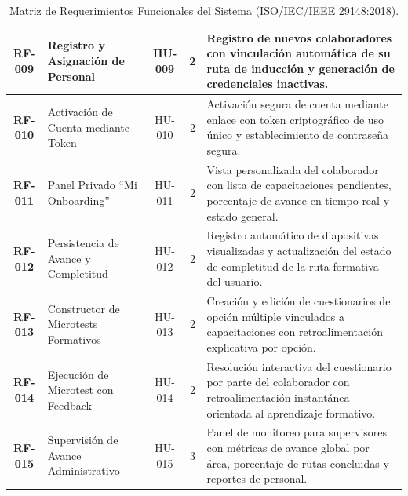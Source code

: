 \documentclass[11pt,a4paper]{article}
\begin{document}
\begin{table}[H]
\begin{tabularx}{\linewidth}{|c|>{\raggedright\arraybackslash}p{3.4cm}|c|c|>{\raggedright\arraybackslash}X|}
\hline
\textbf{RF-009} & Registro y Asignación de Personal & HU-009 & 2 & Registro de nuevos colaboradores con vinculación automática de su ruta de inducción y generación de credenciales inactivas. \\
\hline
\textbf{RF-010} & Activación de Cuenta mediante Token & HU-010 & 2 & Activación segura de cuenta mediante enlace con token criptográfico de uso único y establecimiento de contraseña segura. \\
\hline
\textbf{RF-011} & Panel Privado ``Mi Onboarding'' & HU-011 & 2 & Vista personalizada del colaborador con lista de capacitaciones pendientes, porcentaje de avance en tiempo real y estado general. \\
\hline
\textbf{RF-012} & Persistencia de Avance y Completitud & HU-012 & 2 & Registro automático de diapositivas visualizadas y actualización del estado de completitud de la ruta formativa del usuario. \\
\hline
\textbf{RF-013} & Constructor de Microtests Formativos & HU-013 & 2 & Creación y edición de cuestionarios de opción múltiple vinculados a capacitaciones con retroalimentación explicativa por opción. \\
\hline
\textbf{RF-014} & Ejecución de Microtest con Feedback & HU-014 & 2 & Resolución interactiva del cuestionario por parte del colaborador con retroalimentación instantánea orientada al aprendizaje formativo. \\
\hline
\textbf{RF-015} & Supervisión de Avance Administrativo & HU-015 & 3 & Panel de monitoreo para supervisores con métricas de avance global por área, porcentaje de rutas concluidas y reportes de personal. \\
\hline
\end{tabularx}
\caption{Matriz de Requerimientos Funcionales del Sistema (ISO/IEC/IEEE 29148:2018).}
\end{table}
\end{document}
